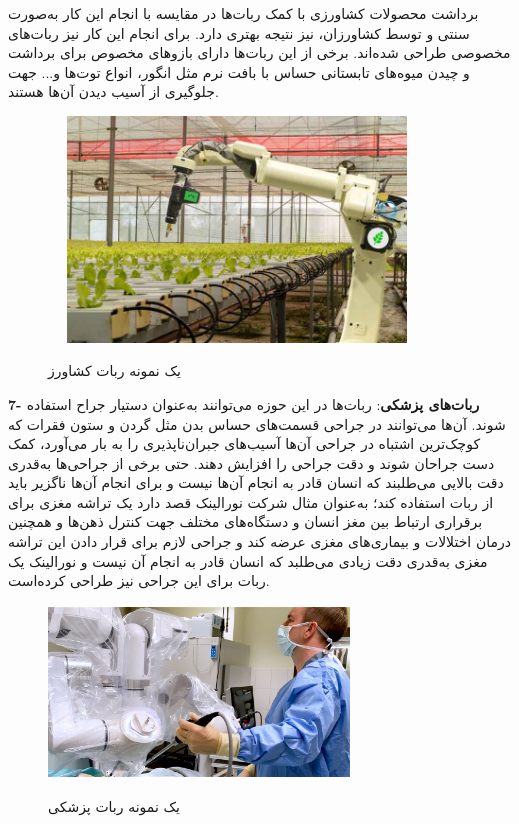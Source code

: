   برداشت محصولات کشاورزی با کمک ربات‌ها در مقایسه با انجام این کار به‌صورت سنتی و توسط کشاورزان، نیز نتیجه بهتری دارد. برای انجام این کار نیز ربات‌های مخصوصی طراحی شده‌اند. برخی از این ربات‌ها دارای بازوهای مخصوص برای برداشت و چیدن میوه‌های تابستانی حساس با بافت نرم مثل انگور، انواع توت‌ها و... جهت جلوگیری از آسیب دیدن آن‌ها هستند.
    \begin{figure}[!h]
	\vspace{0.2cm}
	\centering
	\includegraphics[height=6cm,width=10cm]{./Images/CH1/agricultural_robot.jpeg}
	‌\caption{یک نمونه ربات کشاورز}
	\label{ربات کشاورزی}
	\end{figure}
	
\textbf{7- ربات‌های پزشکی}: 
  ربات‌ها در این حوزه می‌توانند به‌عنوان دستیار جراح استفاده شوند. آن‌ها می‌توانند در جراحی قسمت‌های حساس بدن مثل گردن و ستون فقرات که کوچک‌ترین اشتباه در جراحی آن‌ها آسیب‌های جبران‌ناپذیری را به بار می‌آورد، کمک دست جراحان شوند و دقت جراحی را افزایش دهند. حتی برخی از جراحی‌ها به‌قدری دقت بالایی می‌طلبند که انسان قادر به انجام آن‌ها نیست و برای انجام آن‌ها ناگزیر باید از ربات استفاده کند؛ به‌عنوان مثال شرکت نورالینک
\unskip{}
 قصد دارد یک تراشه مغزی برای برقراری ارتباط بین مغز انسان و دستگاه‌های مختلف جهت کنترل ذهن‌ها و همچنین درمان اختلالات و بیماری‌های مغزی عرضه کند و جراحی لازم برای قرار دادن این تراشه مغزی به‌قدری دقت زیادی می‌طلبد که انسان قادر به انجام آن نیست و نورالینک یک ربات برای این جراحی نیز طراحی کرده‌است.
    \begin{figure}[!h]
	\vspace{0.2cm}
	\centering
	\includegraphics[height=4.6cm,width=8cm]{./Images/CH1/medical_robot.jpg}
	‌\caption{یک نمونه ربات پزشکی}
	\label{ربات پزشکی}
	\end{figure}
	
